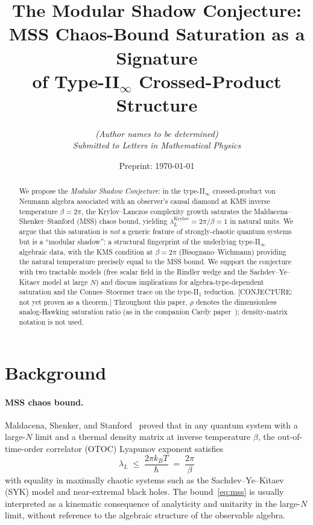 \documentclass[12pt,a4paper]{article}
\title{\textbf{The Modular Shadow Conjecture}:\\[4pt]
       MSS Chaos-Bound Saturation as a Signature\\
       of Type-II$_\infty$ Crossed-Product Structure}
\author{%
  \textit{(Author names to be determined)}\\[2pt]
  \small \textit{Submitted to Letters in Mathematical Physics}
}
\date{Preprint: \today}
\begin{document}
\maketitle

\begin{abstract}
We propose the \emph{Modular Shadow Conjecture}: in the type-II$_\infty$
crossed-product von Neumann algebra associated with an observer's causal
diamond at KMS inverse temperature $\beta = 2\pi$, the Krylov--Lanczos
complexity growth saturates the Maldacena--Shenker--Stanford (MSS)
chaos bound, yielding $\lambda_L^{\mathrm{Krylov}} = 2\pi/\beta = 1$
in natural units.
We argue that this saturation is \emph{not} a generic feature of
strongly-chaotic quantum systems but is a ``modular shadow'': a
structural fingerprint of the underlying type-II$_\infty$ algebraic
data, with the KMS condition at $\beta=2\pi$ (Bisognano--Wichmann)
providing the natural temperature precisely equal to the MSS bound.
We support the conjecture with two tractable models (free scalar field
in the Rindler wedge and the Sachdev--Ye--Kitaev model at large $N$)
and discuss implications for algebra-type-dependent saturation and
the Connes--Stoermer trace on the type-II$_1$ reduction.
[CONJECTURE: not yet proven as a theorem.]
Throughout this paper, $\rho$ denotes the dimensionless analog-Hawking saturation ratio
(as in the companion Cardy paper~\cite{CardyRho}); density-matrix notation is not used.
\end{abstract}

\section{Background}
\label{sec:background}

\paragraph{MSS chaos bound.}
Maldacena, Shenker, and Stanford~\cite{MSS2016} proved that in any
quantum system with a large-$N$ limit and a thermal density matrix at
inverse temperature $\beta$, the out-of-time-order correlator (OTOC)
Lyapunov exponent satisfies
\begin{equation}
  \lambda_L \;\le\; \frac{2\pi k_B T}{\hbar}
            \;=\; \frac{2\pi}{\beta}
  \label{eq:mss}
\end{equation}
with equality in maximally chaotic systems such as the
Sachdev--Ye--Kitaev (SYK) model and near-extremal black holes.
The bound~\eqref{eq:mss} is usually interpreted as a kinematic
consequence of analyticity and unitarity in the large-$N$ limit,
without reference to the algebraic structure of the observable algebra.
\end{document}
